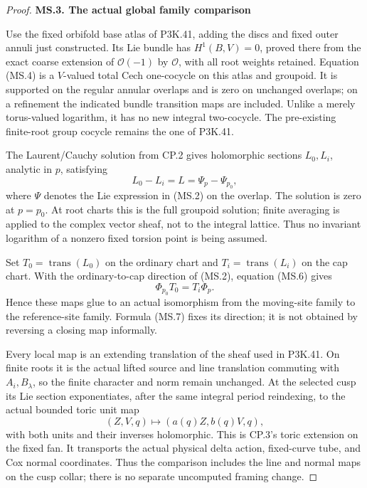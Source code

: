 \begin{proof}
\medskip\noindent\textbf{MS.3. The actual global family comparison}

\par\nobreak

Use the fixed orbifold base atlas of P3K.41, adding the discs and fixed
outer annuli just constructed. Its Lie bundle has
\(H^1(B,V)=0\), proved there from the exact coarse extension of
\(\mathcal O(-1)\) by \(\mathcal O\), with all root weights
retained. Equation (MS.4) is a \(V\)-valued total Cech one-cocycle
on this atlas and groupoid. It is supported on the regular annular
overlaps and is zero on unchanged overlaps; on a refinement the
indicated bundle transition maps are included. Unlike a merely
torus-valued logarithm, it has no new integral two-cocycle. The
pre-existing finite-root group cocycle remains the one of P3K.41.

The Laurent/Cauchy solution from CP.2 gives holomorphic sections
\(L_0,L_i\), analytic in \(p\), satisfying
\[
                    L_0-L_i=L=\Psi_p-\Psi_{p_0},          \tag{MS.6}
\]
where \(\Psi\) denotes the Lie expression in (MS.2) on the
overlap. The solution is zero at \(p=p_0\). At root charts this
is the full groupoid solution; finite averaging is applied to the
complex vector sheaf, not to the integral lattice. Thus no invariant
logarithm of a nonzero fixed torsion point is being assumed.

Set \(T_0=\operatorname{trans}(L_0)\) on the ordinary chart and
\(T_i=\operatorname{trans}(L_i)\) on the cap chart. With the
ordinary-to-cap direction of (MS.2), equation (MS.6) gives
\[
                  \Phi_{p_0}T_0=T_i\Phi_p.                \tag{MS.7}
\]
Hence these maps glue to an actual isomorphism from the moving-site
family to the reference-site family. Formula (MS.7) fixes its direction;
it is not obtained by reversing a closing map informally.

Every local map is an extending translation of the sheaf used in
P3K.41. On finite roots it is the actual lifted source and line
translation commuting with \(A_i,B_\lambda\), so the finite
character and norm remain unchanged. At the selected cusp its Lie
section exponentiates, after the same integral period reindexing, to
the actual bounded toric unit map
\[
                 (Z,V,q)\longmapsto(a(q)Z,b(q)V,q),       \tag{MS.8}
\]
with both units and their inverses holomorphic. This is CP.3's
toric extension on the fixed fan. It transports the actual physical
delta action, fixed-curve tube, and Cox normal coordinates. Thus the
comparison includes the line and normal maps on the cusp collar;
there is no separate uncomputed framing change.


\end{proof}
